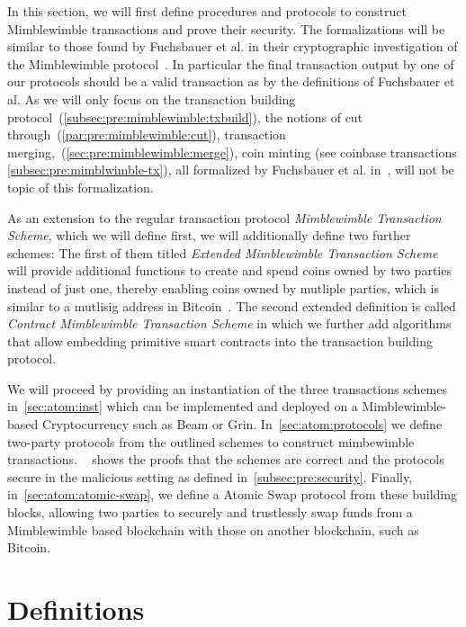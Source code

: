 In this section, we will first define procedures and protocols to construct Mimblewimble transactions and prove their security.
The formalizations will be similar to those found by Fuchsbauer et al. in their cryptographic investigation of the Mimblewimble protocol~\cite{fuchsbauer2019aggregate}.
In particular the final transaction output by one of our protocols should be a valid transaction as by the definitions of Fuchsbauer et al.
As we will only focus on the transaction building protocol~(\cref{subsec:pre:mimblewimble:txbuild}), the notions of cut through~(\cref{par:pre:mimblewimble:cut}), transaction merging,~(\cref{sec:pre:mimblewimble:merge}), coin minting (see coinbase transactions \cref{subsec:pre:mimblwimble-tx}), all formalized by Fuchsbauer et al. in~\cite{fuchsbauer2019aggregate}, will not be topic of this formalization.

As an extension to the regular transaction protocol \emph{Mimblewimble Transaction Scheme}, which we will define first, we will additionally define two further schemes:
The first of them titled \emph{Extended Mimblewimble Transaction Scheme} will provide additional functions to create and spend coins owned by two parties instead of just one, thereby enabling coins owned by mutliple parties, which is similar to a mutlisig address in Bitcoin~\cite{antonopoulos2014mastering}.
The second extended definition is called \emph{Contract Mimblewimble Transaction Scheme} in which we further add algorithms that allow embedding primitive smart contracts into the transaction building protocol.

We will proceed by providing an instantiation of the three transactions schemes in~\cref{sec:atom:inst} which can be implemented and deployed on a Mimblewimble-based Cryptocurrency such as Beam or Grin.
In~\cref{sec:atom:protocols} we define two-party protocols from the outlined schemes to construct mimbewimble transactions.
~ shows the proofs that the schemes are correct and the protocols secure in the malicious setting as defined in~\cref{subsec:pre:security}.
Finally, in~\cref{sec:atom:atomic-swap}, we define a Atomic Swap protocol from these building blocks, allowing two parties to securely and trustlessly swap funds from a Mimblewimble based blockchain with those on another blockchain, such as Bitcoin.

\section{Definitions}\label{sec:atom:definitions}


